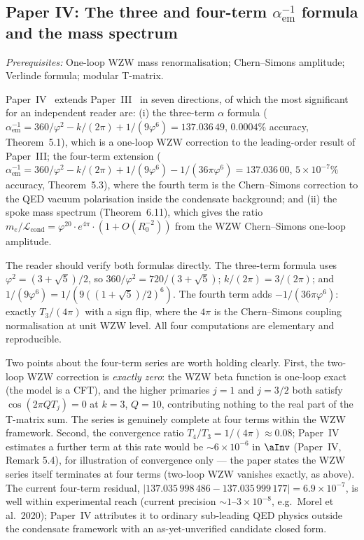 \documentclass[11pt,a4paper]{article}
\newcommand{\vp}{\varphi}
\newcommand{\aem}{\alpha_{\mathrm{em}}}
\begin{document}
\subsection{Paper IV: The three and four-term $\aem^{-1}$ formula and the mass spectrum}

\textit{Prerequisites:} One-loop WZW mass renormalisation; Chern--Simons amplitude;
Verlinde formula; modular T-matrix.

Paper~IV~\cite{Paper4} extends Paper~III~\cite{Paper3} in seven directions, of which the most significant
for an independent reader are: (i) the three-term $\alpha$ formula
($\aem^{-1} = 360/\vp^2 - k/(2\pi) + 1/(9\vp^6) = 137.036\,49$, $0.0004\%$ accuracy,
Theorem~5.1), which is a one-loop WZW correction to the
leading-order result of Paper~III; the four-term extension
($\aem^{-1} = 360/\vp^2 - k/(2\pi) + 1/(9\vp^6) - 1/(36\pi\vp^6) = 137.036\,00$,
$5\times10^{-7}\%$ accuracy, Theorem~5.3),
where the fourth term is the Chern--Simons correction to the QED vacuum
polarisation inside the condensate background; and (ii) the spoke mass spectrum
(Theorem~6.11), which gives the ratio $m_e/\mathcal{L}_{\mathrm{cond}}
= \vp^{20}\cdot e^{4\pi}\cdot(1+O(R_0^{-2}))$ from the WZW Chern--Simons
one-loop amplitude.

The reader should verify both formulas directly.
The three-term formula uses $\vp^2 = (3+\sqrt{5})/2$, so $360/\vp^2 = 720/(3+\sqrt{5})$;
$k/(2\pi) = 3/(2\pi)$; and $1/(9\vp^6) = 1/(9((1+\sqrt{5})/2)^6)$.
The fourth term adds $-1/(36\pi\vp^6)$: exactly $T_3/(4\pi)$ with a sign flip,
where the $4\pi$ is the Chern--Simons coupling normalisation at unit WZW level.
All four computations are elementary and reproducible.

Two points about the four-term series are worth holding clearly.
First, the two-loop WZW correction is \emph{exactly zero}: the WZW beta
function is one-loop exact (the model is a CFT), and the higher primaries
$j=1$ and $j=3/2$ both satisfy $\cos(2\pi Q T_j) = 0$ at $k=3$, $Q=10$,
contributing nothing to the real part of the T-matrix sum.
The series is genuinely complete at four terms within the WZW framework.
Second, the convergence ratio $T_4/T_3=1/(4\pi)\approx0.08$; Paper~IV
estimates a further term at this rate would be $\sim6\times10^{-6}$ in
$\aInv$ (Paper~IV, Remark 5.4), for illustration of convergence only ---
the paper states the WZW series itself terminates at four terms
(two-loop WZW vanishes exactly, as above). The current four-term
residual, $|137.035\,998\,486-137.035\,999\,177|=6.9\times10^{-7}$, is
well within experimental reach (current precision
$\sim1$--$3\times10^{-8}$, e.g.\ Morel et al.\ 2020); Paper~IV
attributes it to ordinary sub-leading QED physics outside the
condensate framework with an as-yet-unverified candidate closed form.
\end{document}
